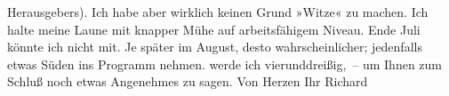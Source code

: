 \begin{ledgroupsized}[t]{13cm}
               Herausgebers). Ich habe aber wirklich keinen Grund »Witze« zu machen. Ich halte meine
               Laune mit knapper Mühe auf arbeits{\pb}fähigem Niveau. Ende Juli könnte ich nicht mit. Je später im August,
               desto wahrscheinlicher; jedenfalls etwas Süden ins Programm nehmen. \label{K_L01046-1v}\label{K_L01046-1h} werde ich vierunddreißig, – um Ihnen zum Schluß noch etwas
               Angenehmes zu sagen.\pend
           \pstart Von Herzen Ihr \spacefill\mbox{Richard}\pend{}
         
         \endnumbering{}\end{ledgroupsized}  \newcommand{\dateiname}{L01046}\newcommand{\titel}{Richard Beer-Hofmann an Arthur Schnitzler, 20. 6. 1900}\newcommand{\editorInnen}{Martin Anton Müller und Gerd-Hermann Susen}
      